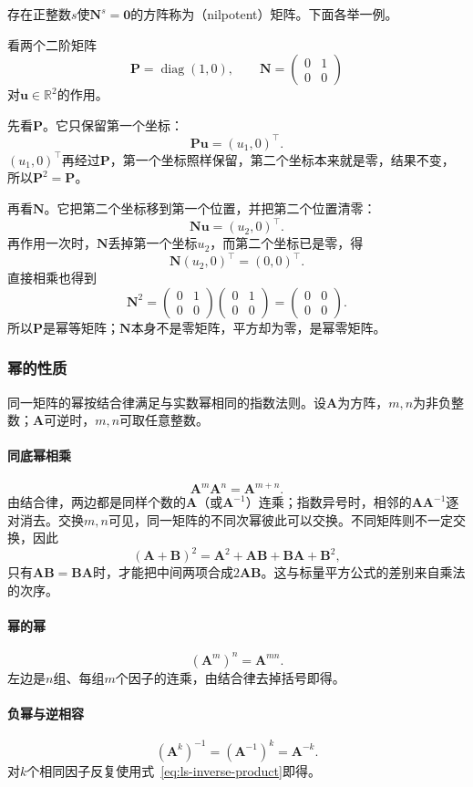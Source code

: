 存在正整数$s$使$\bm N^s=\bm0$的方阵称为（nilpotent）矩阵。下面各举一例。
\begin{example}[幂等矩阵与幂零矩阵]
\label{ex:ls-idempotent-nilpotent}
看两个二阶矩阵
\[
\bm P=\operatorname{diag}(1,0),\qquad
\bm N=\begin{pmatrix}0&1\\0&0\end{pmatrix}
\]
对$\bm u\in\mathbb R^2$的作用。

先看$\bm P$。它只保留第一个坐标：
\[
 \bm P\bm u=(u_1,0)^\top.
\]
$(u_1,0)^\top$再经过$\bm P$，第一个坐标照样保留，第二个坐标本来就是零，结果不变，所以$\bm P^2=\bm P$。

再看$\bm N$。它把第二个坐标移到第一个位置，并把第二个位置清零：
\[
 \bm N\bm u=(u_2,0)^\top.
\]
再作用一次时，$\bm N$丢掉第一个坐标$u_2$，而第二个坐标已是零，得
\[
 \bm N(u_2,0)^\top=(0,0)^\top.
\]
直接相乘也得到
\[
 \bm N^2=\begin{pmatrix}0&1\\0&0\end{pmatrix}\begin{pmatrix}0&1\\0&0\end{pmatrix}=\begin{pmatrix}0&0\\0&0\end{pmatrix}.
\]
所以$\bm P$是幂等矩阵；$\bm N$本身不是零矩阵，平方却为零，是幂零矩阵。
\end{example}

\subsubsection{幂的性质}
同一矩阵的幂按结合律满足与实数幂相同的指数法则。设$\bm A$为方阵，$m,n$为非负整数；$\bm A$可逆时，$m,n$可取任意整数。

\paragraph{同底幂相乘}
\[
 \bm A^m\bm A^n=\bm A^{m+n}.
\]
由结合律，两边都是同样个数的$\bm A$（或$\bm A^{-1}$）连乘；指数异号时，相邻的$\bm A\bm A^{-1}$逐对消去。交换$m,n$可见，同一矩阵的不同次幂彼此可以交换。不同矩阵则不一定交换，因此
\[
 (\bm A+\bm B)^2=\bm A^2+\bm A\bm B+\bm B\bm A+\bm B^2,
\]
只有$\bm A\bm B=\bm B\bm A$时，才能把中间两项合成$2\bm A\bm B$。这与标量平方公式的差别来自乘法的次序。

\paragraph{幂的幂}
\[
 (\bm A^m)^n=\bm A^{mn}.
\]
左边是$n$组、每组$m$个因子的连乘，由结合律去掉括号即得。

\paragraph{负幂与逆相容}
\[
 (\bm A^k)^{-1}=(\bm A^{-1})^k=\bm A^{-k}.
\]
对$k$个相同因子反复使用式~\eqref{eq:ls-inverse-product}即得。

